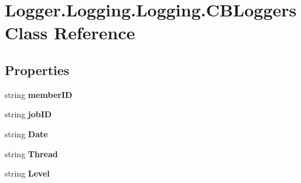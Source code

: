 \hypertarget{class_logger_1_1_logging_1_1_logging_1_1_c_b_loggers}{}\section{Logger.\+Logging.\+Logging.\+C\+B\+Loggers Class Reference}
\label{class_logger_1_1_logging_1_1_logging_1_1_c_b_loggers}
\subsection*{Properties}
\begin{DoxyCompactItemize}
\item 
string {\bfseries member\+ID}\hypertarget{class_logger_1_1_logging_1_1_logging_1_1_c_b_loggers_a3abe5c2aee36107226463da1622d89b9}{}\label{class_logger_1_1_logging_1_1_logging_1_1_c_b_loggers_a3abe5c2aee36107226463da1622d89b9}

\item 
string {\bfseries job\+ID}\hypertarget{class_logger_1_1_logging_1_1_logging_1_1_c_b_loggers_aa9894664e5915a8c941d83723d542c5c}{}\label{class_logger_1_1_logging_1_1_logging_1_1_c_b_loggers_aa9894664e5915a8c941d83723d542c5c}

\item 
string {\bfseries Date}\hypertarget{class_logger_1_1_logging_1_1_logging_1_1_c_b_loggers_a0b8a58a2a7107e2e62bf5d4df95f2ca5}{}\label{class_logger_1_1_logging_1_1_logging_1_1_c_b_loggers_a0b8a58a2a7107e2e62bf5d4df95f2ca5}

\item 
string {\bfseries Thread}\hypertarget{class_logger_1_1_logging_1_1_logging_1_1_c_b_loggers_ab176fb7f2eacd7624432658c71332427}{}\label{class_logger_1_1_logging_1_1_logging_1_1_c_b_loggers_ab176fb7f2eacd7624432658c71332427}

\item 
string {\bfseries Level}\hypertarget{class_logger_1_1_logging_1_1_logging_1_1_c_b_loggers_ab848a361f1ed8c72a47dde534ef1efbd}{}\label{class_logger_1_1_logging_1_1_logging_1_1_c_b_loggers_ab848a361f1ed8c72a47dde534ef1efbd}


\end{DoxyCompactItemize}
